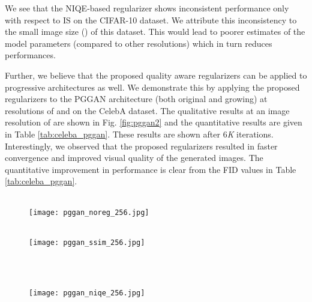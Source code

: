 \documentclass{article}
\begin{document}
We see that the NIQE-based regularizer shows inconsistent performance only with respect to IS on the CIFAR-10 dataset. We attribute this inconsistency to the small image size () of this dataset. This would lead to poorer estimates of the model parameters (compared to other resolutions) which in turn reduces performances.

Further, we believe that the proposed quality aware regularizers can be applied to progressive architectures as well. 
We demonstrate this by applying the proposed regularizers to the PGGAN architecture \cite{karras2018progressive} (both original and growing) at resolutions of  and  on the CelebA dataset. 
The qualitative results at an image resolution of  are shown in Fig. \ref{fig:pggan2} and the quantitative results are given in Table \ref{tab:celeba_pggan}. These results are shown after 6{\em{K}} iterations. Interestingly, we observed that the proposed regularizers resulted in faster convergence and improved visual quality of the generated images. The quantitative improvement in performance is clear from the FID values in Table \ref{tab:celeba_pggan}.
\begin{figure*}[htbp]
\begin{subfigure}{\textwidth}
    \centering
    ~\\
\texttt{[image: pggan\_noreg\_256.jpg]}
\end{subfigure}
    \begin{subfigure}{\textwidth}
    \centering
    ~\\
\texttt{[image: pggan\_ssim\_256.jpg]}
\end{subfigure}
    ~\\
\begin{subfigure}{\textwidth}
    \centering
    ~\\
\texttt{[image: pggan\_niqe\_256.jpg]}
\end{subfigure}
    \caption{Randomly sampled images generated using QAGANs for CelebA dataset with a progressively growing architecture () Top row: PGGAN \cite{karras2018progressive}. Middle row: PGGAN with SSIM. Bottom row: PGGAN with NIQE.}
    \label{fig:pggan2}
\end{figure*}
\end{document}
